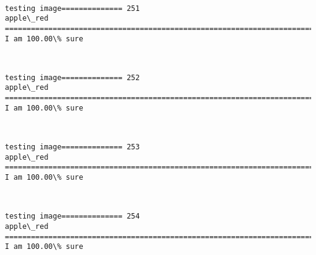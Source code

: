 \documentclass[11pt]{article}
\begin{document}
    \begin{center}
    \end{center}
    { \hspace*{\fill} \\}
    
    \begin{Verbatim}[commandchars=\\\{\}]
testing image============== 251
apple\_red
============================================================================
I am 100.00\% sure

    \end{Verbatim}

    \begin{center}
    \end{center}
    { \hspace*{\fill} \\}
    
    \begin{Verbatim}[commandchars=\\\{\}]
testing image============== 252
apple\_red
============================================================================
I am 100.00\% sure

    \end{Verbatim}

    \begin{center}
    \end{center}
    { \hspace*{\fill} \\}
    
    \begin{Verbatim}[commandchars=\\\{\}]
testing image============== 253
apple\_red
============================================================================
I am 100.00\% sure

    \end{Verbatim}

    \begin{center}
    \end{center}
    { \hspace*{\fill} \\}
    
    \begin{Verbatim}[commandchars=\\\{\}]
testing image============== 254
apple\_red
============================================================================
I am 100.00\% sure

    \end{Verbatim}
\end{document}
